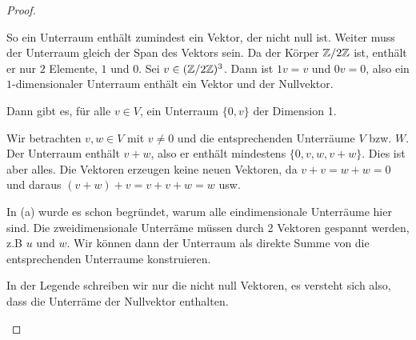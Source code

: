 \begin{proof}
	\begin{parts}
	\item So ein Unterraum enthält zumindest ein Vektor, der nicht null ist. Weiter muss der Unterraum gleich der Span des Vektors sein. Da der Körper $\mathbb{Z} / 2\mathbb{Z}$ ist, enthält er nur $2$ Elemente, $1$ und $0$. Sei $v\in (\mathbb{Z} / 2\mathbb{Z})^3$. Dann ist $1v=v$ und $0v=0$, also ein $1$-dimensionaler Unterraum enthält ein Vektor und der Nullvektor.

		Dann gibt es, f\"{u}r alle $v\in V$, ein Unterraum $\{0, v\} $ der Dimension 1.
	\item Wir betrachten $v,w\in V$ mit $v\neq 0$ und die entsprechenden Unterräume $V$ bzw. $W$. Der Unterraum enthält $v+w$, also er enthält mindestens $\{0,v,w,v+w\} $. Dies ist aber alles. Die Vektoren erzeugen keine neuen Vektoren, da $v+v=w+w=0$ und daraus $(v+w)+v=v+v+w=w$ usw.
	\item In (a) wurde es schon begründet, warum alle eindimensionale Unterräume hier sind. Die zweidimensionale Unterräme müssen durch 2 Vektoren gespannt werden, z.B $u$ und $w$. Wir können dann der Unterraum als direkte Summe von die entsprechenden Unterraume konstruieren.
	\item In der Legende schreiben wir nur die nicht null Vektoren, es versteht sich also, dass die Unterräme der Nullvektor enthalten.


\end{parts}
\end{proof}
